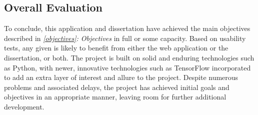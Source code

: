 \subsection{Overall Evaluation}
To conclude, this application and dissertation have achieved the main objectives described in \textit{\ref{objectives}: Objectives} in full or some capacity. Based on usability tests, any given is likely to benefit from either the web application or the dissertation, or both. The project is built on solid and enduring technologies such as Python, with newer, innovative technologies such as TensorFlow incorporated to add an extra layer of interest and allure to the project. Despite numerous problems and associated delays, the project has achieved initial goals and objectives in an appropriate manner, leaving room for further additional development.